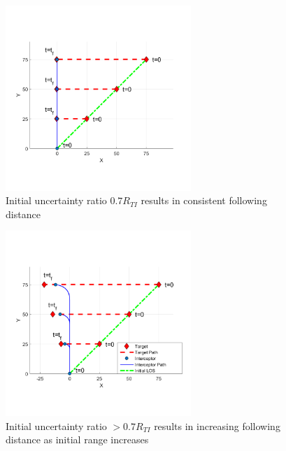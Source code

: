 \documentclass[conference]{IEEEtran}
\begin{document}
\begin{figure}[H]
	\centering
	\includegraphics[width=7cm]{rinit07.png}
	\caption{Initial uncertainty ratio $0.7R_{TI}$ results in consistent following distance}
	\label{fig:rti07}
\end{figure}

\begin{figure}[H]
	\centering
	\includegraphics[width=7cm]{rinit08.png}
	\caption{Initial uncertainty ratio $>0.7R_{TI}$ results in increasing following distance as initial range increases}
	\label{fig:rti08}
\end{figure}



\end{document}
